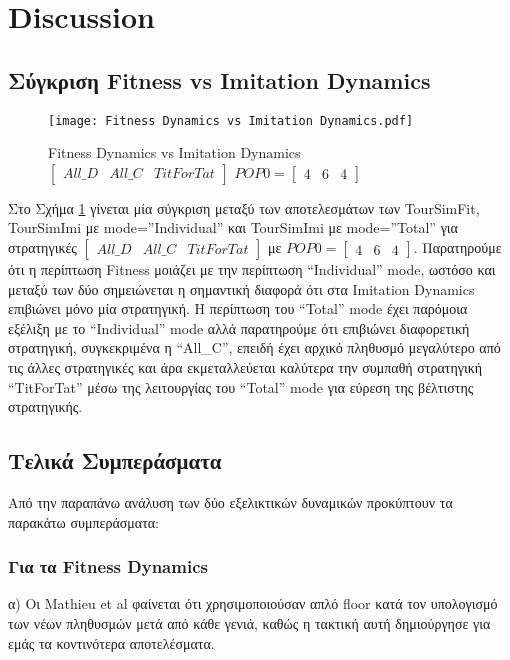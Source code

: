 \section{Discussion}
\subsection{Σύγκριση Fitness vs Imitation Dynamics}
	\begin{figure}[h]
	      \centering
	      \texttt{[image: Fitness Dynamics vs Imitation Dynamics.pdf]}
	      \caption{Fitness Dynamics vs Imitation Dynamics $\begin{bmatrix}All\_D&All\_C&TitForTat\end{bmatrix}$ $POP0=\begin{bmatrix}4&6&4\end{bmatrix}$}
	      \label{fig:Fitness Dynamics vs Imitation Dynamics}
	\end{figure}
Στο Σχήμα \ref{fig:Fitness Dynamics vs Imitation Dynamics} γίνεται μία σύγκριση μεταξύ των αποτελεσμάτων των TourSimFit, TourSimImi με mode=''Individual'' και TourSimImi με mode=''Total'' για στρατηγικές $\begin{bmatrix}All\_D&All\_C&TitForTat\end{bmatrix}$ με $POP0=\begin{bmatrix}4&6&4\end{bmatrix}$.
Παρατηρούμε ότι η περίπτωση Fitness μοιάζει με την περίπτωση ``Individual'' mode, ωστόσο και μεταξύ των δύο σημειώνεται η σημαντική διαφορά ότι στα Imitation Dynamics επιβιώνει μόνο μία στρατηγική. Η περίπτωση του ``Total'' mode έχει παρόμοια εξέλιξη με το ``Individual'' mode αλλά παρατηρούμε ότι επιβιώνει διαφορετική στρατηγική, συγκεκριμένα η ``All\_C'', επειδή έχει αρχικό πληθυσμό μεγαλύτερο από τις άλλες στρατηγικές και άρα εκμεταλλεύεται καλύτερα την συμπαθή στρατηγική ``TitForTat'' μέσω της λειτουργίας του ``Total'' mode για εύρεση της βέλτιστης στρατηγικής.

\subsection{Τελικά Συμπεράσματα}
Από την παραπάνω ανάλυση των δύο εξελικτικών δυναμικών προκύπτουν τα παρακάτω συμπεράσματα:

\subsubsection*{Για τα Fitness Dynamics}
α) Οι Mathieu et al φαίνεται ότι χρησιμοποιούσαν απλό floor κατά τον υπολογισμό των νέων πληθυσμών μετά από κάθε γενιά, καθώς η τακτική αυτή δημιούργησε για εμάς τα κοντινότερα αποτελέσματα.

